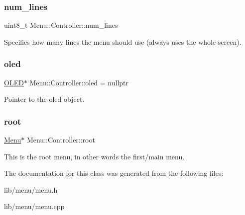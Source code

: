 \subsubsection{\texorpdfstring{num\+\_\+lines}{num\_lines}}
{\footnotesize\ttfamily uint8\+\_\+t Menu\+::\+Controller\+::num\+\_\+lines\hspace{0.3cm}{\ttfamily [private]}}

Specifies how many lines the menu should use (always uses the whole screen). \hypertarget{class_menu_1_1_controller_aaa0388123d9e3bb0d4f546336e2b502d}{}\label{class_menu_1_1_controller_aaa0388123d9e3bb0d4f546336e2b502d} 
\subsubsection{\texorpdfstring{oled}{oled}}
{\footnotesize\ttfamily \hyperlink{class_o_l_e_d}{O\+L\+ED}$\ast$ Menu\+::\+Controller\+::oled = nullptr\hspace{0.3cm}{\ttfamily [private]}}

Pointer to the oled object. \hypertarget{class_menu_1_1_controller_a211b6de05f7eed25f3a7f504c42316e0}{}\label{class_menu_1_1_controller_a211b6de05f7eed25f3a7f504c42316e0} 
\subsubsection{\texorpdfstring{root}{root}}
{\footnotesize\ttfamily \hyperlink{struct_menu_1_1_menu}{Menu}$\ast$ Menu\+::\+Controller\+::root\hspace{0.3cm}{\ttfamily [private]}}

This is the root menu, in other words the first/main menu. 

The documentation for this class was generated from the following files\+:\begin{DoxyCompactItemize}
\item 
lib/menu/menu.\+h\item 
lib/menu/menu.\+cpp\end{DoxyCompactItemize}
